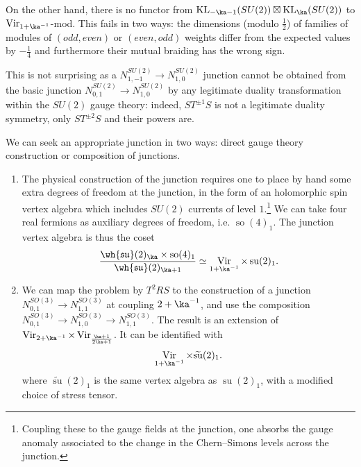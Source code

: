 \documentclass[11pt,reqno]{amsart}
\theoremstyle{plain}
\numberwithin{equation}{section}
\DeclareMathOperator{\Vir}{Vir}
\DeclareMathOperator{\tsu}{su}
\DeclareMathOperator{\tso}{so}
\DeclareMathOperator{\KL}{KL}
\theoremstyle{definition}
\begin{document}
On the other hand, there is no functor from
$\KL_{-\ka-1}(SU(2)) \boxtimes \KL_{\ka}(SU(2))$ to $\Vir_{1+\ka^{-1}}$-mod.
This fails in two ways: the dimensions (modulo $\frac12$) of families
of modules of $(odd,even)$ or $(even,odd)$ weights differ from the
expected values by $-\frac14$ and furthermore their mutual braiding
has the wrong sign.

This is not surprising as a $N^{SU(2)}_{1,-1} \to N^{SU(2)}_{1,0}$ 
junction cannot be obtained from the
basic junction $N^{SU(2)}_{0,1} \to N^{SU(2)}_{1,0}$ by any legitimate
duality transformation within the $SU(2)$ gauge theory: indeed, $S
T^{\pm 1} S$ is not a legitimate duality symmetry, only $S T^{\pm 2}
S$ and their powers are.

We can seek an appropriate junction in two ways: direct gauge theory construction 
or composition of junctions.

\medskip

\begin{enumerate}
\item The physical construction of the junction requires one to place by hand some extra
degrees of freedom at the junction, in the form of an holomorphic spin vertex algebra
which includes $SU(2)$ currents of level $1$.\footnote{Coupling these to the
gauge fields at the junction, one absorbs the gauge anomaly associated
to the change in the Chern--Simons levels across the junction.} We can take four real fermions as auxiliary degrees of freedom, i.e. $\tso(4)_1$. The junction vertex algebra is thus the coset 
\begin{equation}    \label{Vir su2}
\frac{\wh{\mathfrak{su}}(2)_{\ka} \times
  \tso(4)_1}{\wh{\mathfrak{su}}(2)_{\ka+1}}\simeq \Vir_{1+\ka^{-1}} \times \tsu(2)_1.
\end{equation}

\medskip

\item We can map the problem by $T^2RS$ to the construction of a junction
$N^{SO(3)}_{0,1} \to N^{SO(3)}_{1,1}$ at coupling $2+\ka^{-1}$, and use the composition 
$N^{SO(3)}_{0,1} \to N^{SO(3)}_{1,0} \to N^{SO(3)}_{1,1}$. 
The result is an extension of $\Vir_{2+\ka^{-1}} \times \Vir_{\frac{\ka+1}{2\ka+1}}$.
It can be identified with
\begin{equation}  
\Vir_{1+\ka^{-1}} \times \widetilde{\tsu}(2)_1.
\end{equation}
where $\widetilde{\tsu}(2)_1$ is the same vertex algebra as $\tsu(2)_1$, with a modified choice of 
stress tensor. 
\end{enumerate}
\end{document}
